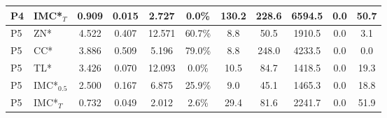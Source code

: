 \begin{tabular}{@{}llccccccccc@{}}
P4 & IMC*$_{T}$ & 0.909 & 0.015 & 2.727 & 0.0\% & 130.2 & 228.6 & 6594.5 & 0.0 & 50.7 \\
\midrule
P5 & ZN* & 4.522 & 0.407 & 12.571 & 60.7\% & 8.8 & 50.5 & 1910.5 & 0.0 & 3.1 \\
P5 & CC* & 3.886 & 0.509 & 5.196 & 79.0\% & 8.8 & 248.0 & 4233.5 & 0.0 & 0.0 \\
P5 & TL* & 3.426 & 0.070 & 12.093 & 0.0\% & 10.5 & 84.7 & 1418.5 & 0.0 & 19.3 \\
P5 & IMC*$_{0.5}$ & 2.500 & 0.167 & 6.875 & 25.9\% & 9.0 & 45.1 & 1465.3 & 0.0 & 18.8 \\
P5 & IMC*$_{T}$ & 0.732 & 0.049 & 2.012 & 2.6\% & 29.4 & 81.6 & 2241.7 & 0.0 & 51.9 \\
\bottomrule
\end{tabular}
